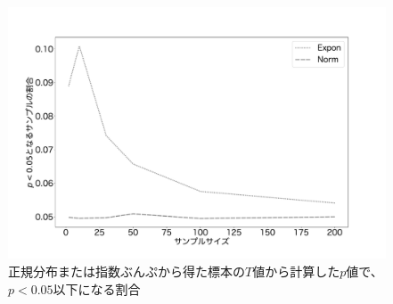 \begin{figure}
    \begin{center}
        \includegraphics[width=15cm]{./image/04_/t_test_expon_norm.pdf}
        \caption{正規分布または指数ぶんぷから得た標本の$T$値から計算した$p$値で、$p<0.05$以下になる割合}
    \end{center}
\end{figure}

